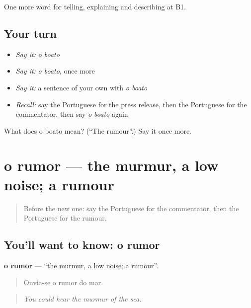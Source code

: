 \begin{grammarlens}[title={What you've built}]
One more word for telling, explaining and describing at B1.
\end{grammarlens}

\subsection*{Your turn}
\begin{itemize}
\raggedright
  \item \emph{Say it:} \emph{o boato}
  \item \emph{Say it:} \emph{o boato}, once more
  \item \emph{Say it:} a sentence of your own with \emph{o boato}
  \item \emph{Recall:} say the Portuguese for the press release, then the Portuguese for the commentator, then say \emph{o boato} again
\end{itemize}

\begin{tcolorbox}[breakable,colback=teal!4,colframe=teal!35!black,title={Before you move on}]
What does o boato mean? (\textquotedblleft{}The rumour\textquotedblright{}.) Say it once more.
\end{tcolorbox}
\section[o rumor]{o rumor — the murmur, a low noise; a rumour}

\label{lesson:PT-C283-rumor}



\begin{quote}
Before the new one: say the Portuguese for the commentator, then the Portuguese for the rumour.
\end{quote}

\subsection*{You'll want to know: o rumor}
\textbf{o rumor} — \textquotedblleft{}the murmur, a low noise; a rumour\textquotedblright{}.

\begin{quote}
Ouvia-se o rumor do mar.
\end{quote}

\begin{quote}
\emph{You could hear the murmur of the sea.}
\end{quote}

